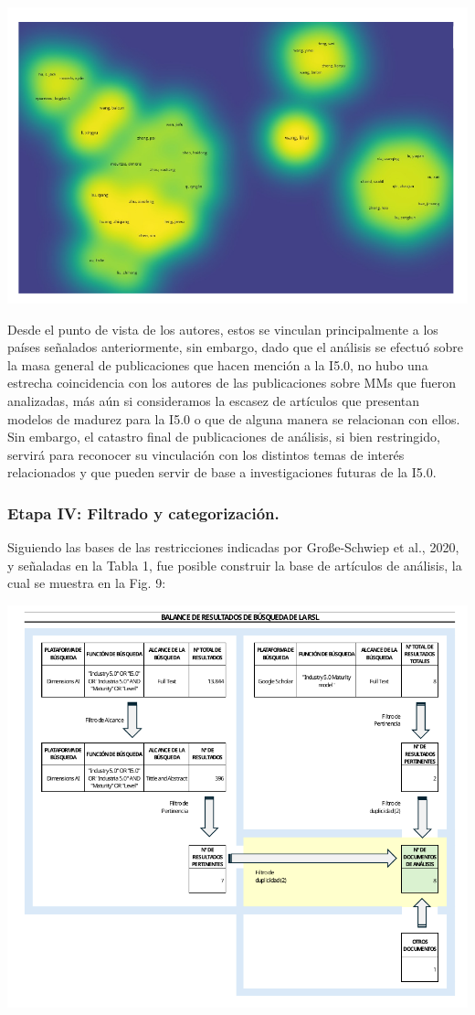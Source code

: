 \documentclass{article}
\begin{document}
\includegraphics{images/clipboard-2221449078.png}

Desde el punto de vista de los autores, estos se vinculan principalmente
a los países señalados anteriormente, sin embargo, dado que el análisis
se efectuó sobre la masa general de publicaciones que hacen mención a la
I5.0, no hubo una estrecha coincidencia con los autores de las
publicaciones sobre MMs que fueron analizadas, más aún si consideramos
la escasez de artículos que presentan modelos de madurez para la I5.0 o
que de alguna manera se relacionan con ellos. Sin embargo, el catastro
final de publicaciones de análisis, si bien restringido, servirá para
reconocer su vinculación con los distintos temas de interés relacionados
y que pueden servir de base a investigaciones futuras de la I5.0.

\subsubsection{Etapa IV: Filtrado y
categorización.}\label{etapa-iv-filtrado-y-categorizaciuxf3n.}

Siguiendo las bases de las restricciones indicadas por Große-Schwiep et
al., 2020, y señaladas en la Tabla 1, fue posible construir la base de
artículos de análisis, la cual se muestra en la Fig. 9:

\includegraphics{images/clipboard-2426858467.png}
\end{document}
